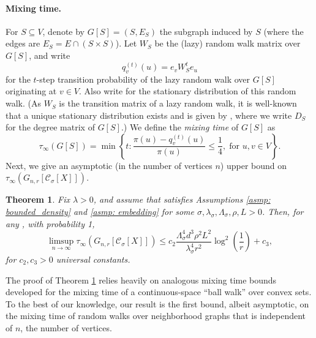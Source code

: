 \documentclass{article}
\newcommand{\set}[1]{\left\{#1\right\}}
\newcommand{\vol}{\mathrm{vol}}
\newcommand{\1}{\mathbf{1}}
\newcommand{\Xbf}{X}             %
\newcommand{\Wbf}{W}
\newcommand{\Dbf}{D}
\newcommand{\Cbb}{\mathbb{C}}
\newcommand{\Cset}{\mathcal{C}}
\newcommand{\Csig}{\Cset_{\sigma}}
\theoremstyle{aldenthm}
\newtheorem{theorem}{Theorem}
\theoremstyle{aldenrmrk}
\begin{document}
\paragraph{Mixing time.} For $S \subseteq V$, denote by $G[S] = (S, E_S)$ the
subgraph induced by $S$ (where the edges are $E_S = E \cap (S \times S)$). Let
$\Wbf_S$ be the (lazy) random walk matrix over $G[S]$, and write  
$$
q_{v}^{(t)}(u) = e_v\Wbf_S^t e_u
$$
for the $t$-step transition probability of the lazy random walk over $G[S]$
originating at $v \in V$. Also write 
for the stationary distribution of this random walk.  (As
$\Wbf_S$ is the transition matrix of a lazy random walk, 
it is well-known that a unique stationary distribution exists and is given by 
\smash{$\pi(u) = (\Dbf_S)_{uu}/\vol(S; G[S])$}, where we write $\Dbf_S$ for the  
degree matrix of $G[S]$.) We define the \emph{mixing time} of $G[S]$ as
\begin{equation}
\label{eqn: mixing_time}
\tau_{\infty}(G[S]) = \min\set{ t: \frac{\pi(u) - q_{v}^{(t)}(u)}
  {\pi(u)} \leq \frac{1}{4}, \; \text{for $u,v \in V$}}. 
\end{equation}
Next, we give an asymptotic (in the number of vertices $n$) upper bound on
$\tau_{\infty}(G_{n,r}[\Csig[\Xbf]])$.  

\begin{theorem}
  \label{thm: mixing_time_upper_bound}
  Fix $\lambda > 0$, and assume that \smash{$\Cset \in \Cbb_f(\lambda)$}
  satisfies Assumptions \ref{asmp: bounded_density} and \ref{asmp: embedding}
  for some $\sigma, \lambda_{\sigma}, \Lambda_{\sigma}, \rho, L > 0$. Then, for
  any , with probability 1,
  \begin{equation} 
    \label{eqn: mixing_time_upper_bound}
    \limsup_{n \to \infty}\tau_{\infty}(G_{n,r}[\Csig[\Xbf]]) \leq c_2
    \frac{\Lambda_{\sigma}^4 d^3 \rho^2 L^2}{\lambda_{\sigma}^4 r^2}
    \log^2\left(\frac{1}{r}\right) + c_3,
  \end{equation}
  for $c_2,c_3 > 0$ universal constants. 
\end{theorem}

The proof of Theorem \ref{thm: mixing_time_upper_bound} relies heavily on
analogous mixing time bounds developed for the mixing time of a
continuous-space ``ball walk'' over convex sets. To the best of our knowledge, our
result is the first bound, albeit asymptotic, on the mixing time of random walks
over neighborhood graphs that is independent of $n$, the number of vertices.   
\end{document}
